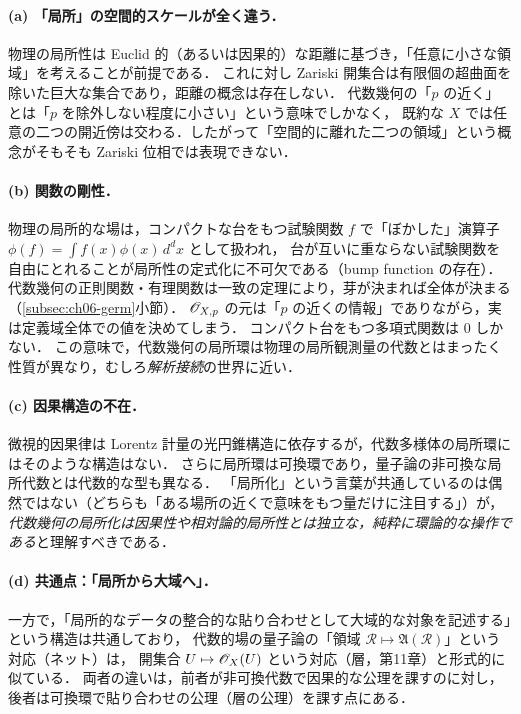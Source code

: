 \paragraph{(a) 「局所」の空間的スケールが全く違う．}
物理の局所性は Euclid 的（あるいは因果的）な距離に基づき，「任意に小さな領域」を考えることが前提である．
これに対し Zariski 開集合は有限個の超曲面を除いた巨大な集合であり，距離の概念は存在しない．
代数幾何の「$p$ の近く」とは「$p$ を除外しない程度に小さい」という意味でしかなく，
既約な $X$ では任意の二つの開近傍は交わる．したがって「空間的に離れた二つの領域」という概念がそもそも Zariski 位相では表現できない．

\paragraph{(b) 関数の剛性．}
物理の局所的な場は，コンパクトな台をもつ試験関数 $f$ で「ぼかした」演算子 $\phi(f)=\int f(x)\phi(x)\,d^dx$ として扱われ，
台が互いに重ならない試験関数を自由にとれることが局所性の定式化に不可欠である（bump function の存在）．
代数幾何の正則関数・有理関数は一致の定理により，芽が決まれば全体が決まる（\ref{subsec:ch06-germ}小節）．
$\mathscr{O}_{X,p}$ の元は「$p$ の近くの情報」でありながら，実は定義域全体での値を決めてしまう．
コンパクト台をもつ多項式関数は $0$ しかない．
この意味で，代数幾何の局所環は物理の局所観測量の代数とはまったく性質が異なり，むしろ\emph{解析接続}の世界に近い．

\paragraph{(c) 因果構造の不在．}
微視的因果律は Lorentz 計量の光円錐構造に依存するが，代数多様体の局所環にはそのような構造はない．
さらに局所環は可換環であり，量子論の非可換な局所代数とは代数的な型も異なる．
「局所化」という言葉が共通しているのは偶然ではない（どちらも「ある場所の近くで意味をもつ量だけに注目する」）が，
\emph{代数幾何の局所化は因果性や相対論的局所性とは独立な，純粋に環論的な操作である}と理解すべきである．

\paragraph{(d) 共通点：「局所から大域へ」．}
一方で，「局所的なデータの整合的な貼り合わせとして大域的な対象を記述する」という構造は共通しており，
代数的場の量子論の「領域 $\mathcal R\mapsto\mathfrak A(\mathcal R)$」という対応（ネット）は，
開集合 $U\mapsto\mathscr{O}_X(U)$ という対応（層，第11章）と形式的に似ている．
両者の違いは，前者が非可換代数で因果的な公理を課すのに対し，後者は可換環で貼り合わせの公理（層の公理）を課す点にある．

